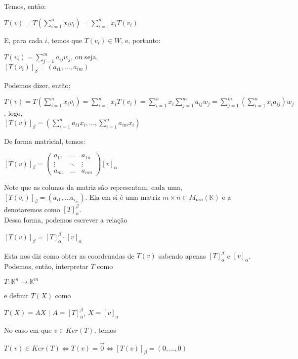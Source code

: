 \documentclass[12pt]{article}
\begin{document}
	Temos, então:
	\begin{center}
		$T(v) = T \left( \sum\limits^n_{i=1} x_i v_i \right) = \sum\limits^n_{i=1}x_i T(v_i)$
	\end{center}
	E, para cada $i$, temos que $T(v_i) \in W$, e, portanto:
	\begin{center}
		$T(v_i) = \sum\limits^m_{j=1} a_{ij} w_j$, ou seja,\\[5pt]
		$[T(v_i)]_\beta  = (a_{i1}, \dots, a_{im})$
	\end{center}
	Podemos dizer, então:
	\begin{center}
		$T(v) = T \left( \sum\limits^n_{i=1} x_i v_i \right) = \sum\limits^n_{i=1}x_i T(v_i) = \sum\limits^n_{i=1}x_i \sum\limits^m_{j=1} a_{ij} w_j = \sum\limits^m_{j=1} \left( \sum\limits^n_{i=1}x_i a_{ij} \right) w_j$, logo,\\[5pt]
		$[T(v)]_\beta = \left( \sum\limits^n_{i=1} a_{i1} x_i, \dots, \sum\limits^n_{i=1} a_{im} x_i \right)$
	\end{center}
	De forma matricial, temos:
	\begin{center}
		$ [T(v)]_\beta =
		\begin{pmatrix}
		a_{11} & \dots & a_{1n} \\
		\vdots & \ddots & \vdots \\
		a_{m1} & \dots & a_{mn} 
		\end{pmatrix}
		[v]_\alpha$
	\end{center}
	Note que as colunas da matriz são representam, cada uma, $[T(v_i)]_\beta = (a_{i1}, \dots a_{i_m})$. Ela em si é uma matriz $m \times n \in M_{mn}(\mathbb{K})$ e a denotaremos como $[T]^\beta_\alpha$.\\
	Dessa forma, podemos escrever a relação
	\begin{center}
		$[T(v)]_\beta = [T]^\beta_\alpha \cdot [v]_\alpha$
	\end{center}
	Esta nos diz como obter as coordenadas de $T(v)$ sabendo apenas $[T]^\beta_\alpha$ e $[v]_\alpha$.\\[10pt]
	Podemos, então, interpretar $T$ como
	\begin{center}
		$T: \mathbb{K}^n \rightarrow \mathbb{K}^m$
	\end{center}
	e definir $T(X)$ como
	\begin{center}
		$T(X) = AX$ $\vert$ $A = [T]_\alpha^\beta$, $X = [v]_\alpha$
	\end{center}
	No caso em que $v \in Ker(T)$, temos
	\begin{center}
		$T(v) \in Ker(T) \Leftrightarrow T(v) = \overrightarrow{0} \Leftrightarrow [T(v)]_\beta = (0, \dots, 0)$	
	\end{center}
\end{document}
